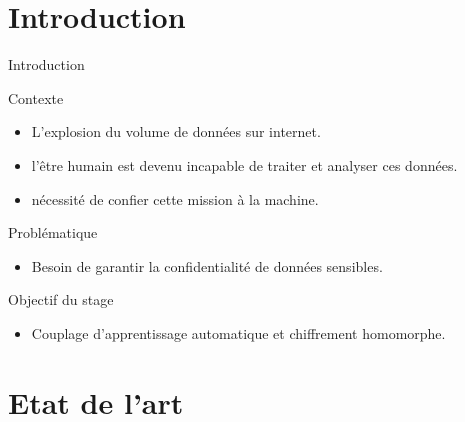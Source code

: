 \documentclass{beamer}
\begin{document}
 \section{Introduction}
\begin{frame}{Introduction}
\begin{block}{Contexte}
\begin{itemize}
	\item{L'explosion du volume de données sur internet.}
	\item{l'être humain est devenu incapable de traiter et analyser ces données.}
	\item{nécessité de confier cette mission à la machine.}
\end{itemize}
\end{block}
\begin{block}{Problématique}
\begin{itemize}
	\item{Besoin de garantir la confidentialité de données sensibles.}
	\end{itemize}
\end{block}
\begin{block}{Objectif du stage}
\begin{itemize}
\item{Couplage d'apprentissage automatique et chiffrement homomorphe.}
\end{itemize}
\end{block}
\end{frame}
\section{Etat de l'art}
\end{document}
